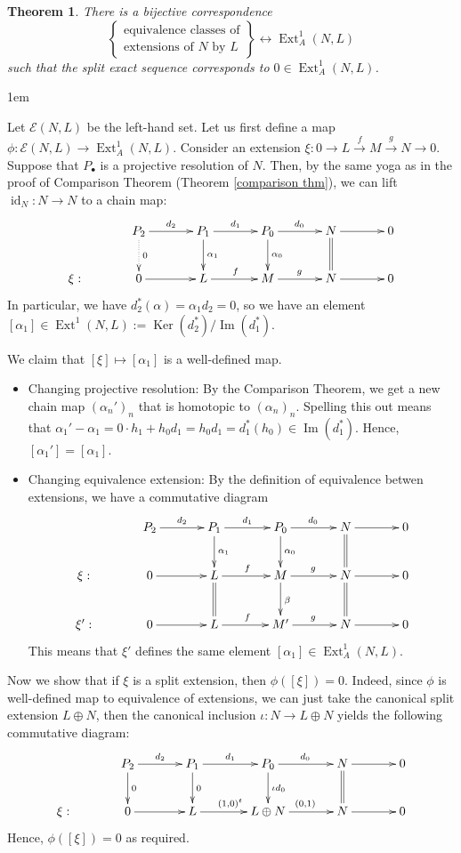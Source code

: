 \documentclass[11pt,a4paper]{article}
\makeatletter
\numberwithin{equation}{section}
\renewenvironment{proof}[1][\proofname]{\par
    \pushQED{\qed}%
    \normalfont \topsep0\p@\@plus6\p@ \labelsep1em\relax
    \trivlist
    \item[\hskip\labelsep\indent
        \bfseries #1]\ignorespaces
    \mbox{}
}{
    \popQED\endtrivlist\@endpefalse
}
\theoremstyle{all}
\newtheorem{theorem}{Theorem}[section]
\theoremstyle{remark}
\newcommand{\id}{\operatorname{id}}
\newcommand{\Ext}{\operatorname{Ext}\nolimits}
\renewcommand{\Im}{\operatorname{Im}\nolimits}
\newcommand{\Ker}{\operatorname{Ker}\nolimits}
\makeatother
\begin{document}
\begin{theorem}
There is a bijective correspondence
\[
\left\{
\begin{array}{c}
\text{equivalence classes of}\\
\text{extensions of $N$ by $L$}
\end{array}\right\} \leftrightarrow \Ext_A^1(N,L)
\]
such that the split exact sequence corresponds to $0\in \Ext_A^1(N,L)$.
\end{theorem}
\begin{proof}
Let $\mathcal{E}(N,L)$ be the left-hand set.  Let us first define a map $\phi:\mathcal{E}(N,L)\to \Ext^1_A(N,L)$.
Consider an extension $\xi: 0\to L\xrightarrow{f} M\xrightarrow{g} N\to 0$.
Suppose that $P_\bullet$ is a projective resolution of $N$.
Then, by the same yoga as in the proof of Comparison Theorem (Theorem \ref{comparison thm}), we can lift $\id_N:N\to N$ to a chain map:
\[
\xymatrix@C=35pt{
& P_2\ar[r]^{d_2}\ar@{.>}[d]^0 & P_1 \ar[r]^{d_1}\ar[d]^{\alpha_1} & P_0\ar[r]^{d_0} \ar[d]^{\alpha_0}& N\ar[r]\ar@{=}[d]&0 \\
\xi: &0\ar[r] & L \ar[r]^{f} & M\ar[r]^{g} & N\ar[r]&0
}
\]
In particular, we have $d_2^*(\alpha)=\alpha_1d_2=0$, so we have an element $[\alpha_1]\in \Ext^1(N,L):=\Ker(d_2^*)/\Im(d_1^*)$. 

We claim that $[\xi]\mapsto [\alpha_1]$ is a well-defined map.
\begin{itemize}
\item Changing projective resolution:  By the Comparison Theorem, we get a new chain map $(\alpha_n')_n$ that is homotopic to $(\alpha_n)_n$.  Spelling this out means that $\alpha_1'-\alpha_1=0\cdot h_1+h_0d_1=h_0d_1 = d_1^*(h_0) \in \Im(d_1^*)$.  Hence, $[\alpha_1']=[\alpha_1]$.

\item Changing equivalence extension: By the definition of equivalence betwen extensions, we have a commutative diagram
\[
\xymatrix@C=35pt{
& P_2\ar[r]^{d_2} & P_1 \ar[r]^{d_1}\ar[d]^{\alpha_1} & P_0\ar[r]^{d_0} \ar[d]^{\alpha_0}& N\ar[r]\ar@{=}[d]&0 \\
\xi: &0\ar[r] & L \ar[r]^{f}\ar@{=}[d] & M\ar[r]^{g}\ar[d]^{\beta} & N\ar[r]\ar@{=}[d]&0\\
\xi': &0\ar[r] & L \ar[r]^{f} & M'\ar[r]^{g} & N\ar[r]&0
}
\]
This means that $\xi'$ defines the same element $[\alpha_1]\in \Ext_A^1(N,L)$.
\end{itemize}

Now we show that if $\xi$ is a split extension, then $\phi([\xi])=0$.  Indeed, since $\phi$ is well-defined map to equivalence of extensions, we can just take the canonical split extension $L\oplus N$, then the canonical inclusion $\iota:N\to L\oplus N$ yields the following commutative diagram:
\[
\xymatrix@C=35pt{
& P_2\ar[r]^{d_2}\ar[d]^0 & P_1 \ar[r]^{d_1}\ar[d]^{0} & P_0\ar[r]^{d_0} \ar[d]^{\iota d_0}& N\ar[r]\ar@{=}[d]&0 \\
\xi: &0\ar[r] & L \ar[r]^{(1,0)^t} & L\oplus N \ar[r]^{(0,1)} & N\ar[r]&0
}
\]
Hence, $\phi([\xi])=0$ as required.


\end{proof}
\end{document}
